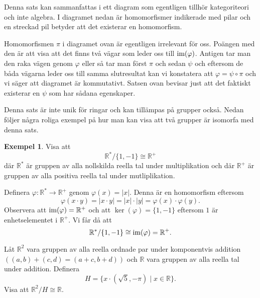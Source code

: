 \documentclass{article}
\newcommand{\im}[0]{\textnormal{im}}
\theoremstyle{definition}
\newtheorem{exmp}[thm]{Exempel}
\begin{document}
Denna sats kan sammanfattas i ett diagram som egentligen tillhör kategoriteori och inte algebra.
I diagramet nedan är homomorfismer indikerade med pilar och en streckad pil betyder att det existerar en homomorfism. 

\begin{center}
\end{center}

Homomorfismen $\pi$ i diagramet ovan är egentligen irrelevant för oss. Poängen med den är att visa att det finns två vägar som leder oss 
till $\im(\varphi)$. Antigen tar man den raka vägen genom $\varphi$ eller så tar man först $\pi$ och sedan $\psi$ och eftersom 
de båda vägarna leder oss till samma slutresultat kan vi konstatera att $\varphi = \psi \circ \pi$ och vi säger att 
diagramet är kommutativt. Satsen ovan bevisar just 
att det faktiskt existerar en $\psi$ som har sådana egenskaper. 

Denna sats är inte unik för ringar och kan tillämpas på grupper också. Nedan följer några roliga exempel på hur man kan visa att 
två grupper är isomorfa med denna sats. 
\begin{exmp}
  Visa att 
  \[\mathbb{R}^*/\{1, -1\} \cong \mathbb{R}^+\]
  där $\mathbb{R}^*$ är gruppen av alla nollskilda reella tal under multiplikation och där $\mathbb{R}^+$ är gruppen av alla positiva reella tal under mutliplikation.

  Definera $\varphi: \mathbb{R}^* \rightarrow \mathbb{R}^+$ genom $\varphi(x) = |x|.$
  Denna är en homomorfism eftersom 
  \[\varphi(x \cdot y) = |x \cdot y| = |x| \cdot |y| = \varphi(x) \cdot \varphi(y).\]
  Observera att $\im(\varphi) = \mathbb{R}^+$ och att $\ker(\varphi) = \{1, -1\}$ eftersom $1$ är enhetselementet i $\mathbb{R}^+$. Vi får då att 
  \[\mathbb{R}^* / \{1, -1\} \cong \im(\varphi) = \mathbb{R}^+.\] 
\end{exmp}

\begin{ovning}{1}
  Låt $\mathbb{R}^2$ vara gruppen av alla reella ordnade par under komponentvis addition $((a, b) + (c, d) = (a + c, b + d))$ och $\mathbb{R}$
  vara gruppen av alla reella tal under addition. Definera 
  \[H = \biggl\{x \cdot (\sqrt 5, -\pi) \; | \; x \in \mathbb{R} \biggr\}.\]
  Visa att $\mathbb{R}^2 / H \cong \mathbb{R}.$
\end{ovning}
\end{document}
